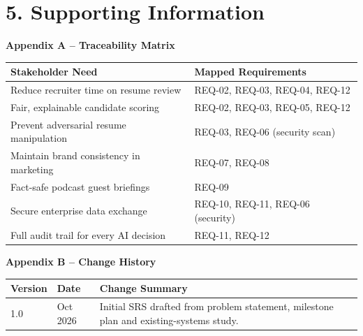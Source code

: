 \vspace{16pt}
\section*{5. Supporting Information}

\noindent\textbf{Appendix A -- Traceability Matrix}

\renewcommand{\arraystretch}{1.12}
\noindent\begin{tabular}{|p{}|p{}|}
\hline
\textbf{Stakeholder Need} & \textbf{Mapped Requirements} \\ \hline
Reduce recruiter time on resume review & REQ-02, REQ-03, REQ-04, REQ-12 \\ \hline
Fair, explainable candidate scoring & REQ-02, REQ-03, REQ-05, REQ-12 \\ \hline
Prevent adversarial resume manipulation & REQ-03, REQ-06 (security scan) \\ \hline
Maintain brand consistency in marketing & REQ-07, REQ-08 \\ \hline
Fact-safe podcast guest briefings & REQ-09 \\ \hline
Secure enterprise data exchange & REQ-10, REQ-11, REQ-06 (security) \\ \hline
Full audit trail for every AI decision & REQ-11, REQ-12 \\ \hline
\end{tabular}

\vspace{10pt}
\noindent\textbf{Appendix B -- Change History}

\noindent\begin{tabular}{|p{}|p{}|p{}|}
\hline
\textbf{Version} & \textbf{Date} & \textbf{Change Summary} \\ \hline
1.0 & Oct 2026 & Initial SRS drafted from problem statement, milestone plan and existing-systems study. \\ \hline
\end{tabular}
